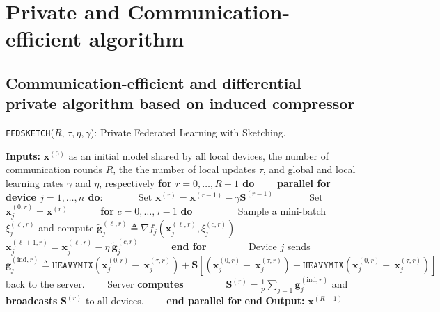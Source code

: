 \section{Private and Communication-efficient algorithm}


\subsection{Communication-efficient and differential private algorithm based on induced compressor}

\begin{algorithm}[H]
\caption{\texttt{FEDSKETCH}($R$, $\tau, \eta, \gamma$): Private Federated Learning with Sketching. }\label{Alg:combined}
\begin{algorithmic}[1]
\State \textbf{Inputs:} $\boldsymbol{x}^{(0)}$ as an initial  model shared by all local devices, the number of communication rounds $R$, the the number of local updates $\tau$, and global and local learning rates $\gamma$ and $\eta$, respectively
\State \textbf{for $r=0, \ldots, R-1$ do}
\State $\qquad$\textbf{parallel for device $j=1,\ldots,n$ do}:
\State $\qquad\quad$ Set $\boldsymbol{x}^{(r)}=\boldsymbol{x}^{(r-1)}-\gamma{\mathbf{S}}^{(r-1)}$
\State $\qquad\quad$ Set $\boldsymbol{x}_j^{(0,r)}=\boldsymbol{x}^{(r)}$ 
\State $\qquad\quad $\textbf{for} $c=0,\ldots,\tau-1$ \textbf{do}
\State $\qquad\quad\quad$ Sample a mini-batch $\xi_j^{(\ell,r)}$ and compute $\tilde{\mathbf{g}}_{j}^{(\ell,r)}\triangleq\nabla{f}_j(\boldsymbol{x}^{(\ell,r)}_j,\xi_j^{(c,r)})$
\State $\qquad\quad\quad$ $\boldsymbol{x}^{(\ell+1,r)}_{j}=\boldsymbol{x}^{(\ell,r)}_j-\eta~ \tilde{\mathbf{g}}_{j}^{(c,r)}$ \label{eq:update-rule-alg}
\State $\qquad\quad$\textbf{end for}
\State $\qquad\quad\quad$Device $j$ sends $$\mathbf{g}^{(\text{ind},r)}_j\triangleq \texttt{HEAVYMIX}\left(\boldsymbol{x}_j^{(0,r)}-~{\boldsymbol{x}}_{j}^{(\tau,r)}\right)+\mathbf{S}\left[\left(\boldsymbol{x}_j^{(0,r)}-~{\boldsymbol{x}}_{j}^{(\tau,r)}\right)-\texttt{HEAVYMIX}\left(\boldsymbol{x}_j^{(0,r)}-~{\boldsymbol{x}}_{j}^{(\tau,r)}\right)\right]$$ 
back to the server.
\State $\qquad$Server \textbf{computes} 
\State $\qquad\qquad {\mathbf{S}}^{(r)}=\frac{1}{p}\sum_{j=1}\mathbf{g}^{(\text{ind},r)}_j$ and \textbf{broadcasts} ${\mathbf{S}}^{(r)}$ to all devices.
\State $\qquad$\textbf{end parallel for}
\State \textbf{end}
\State \textbf{Output:} ${\boldsymbol{x}}^{(R-1)}$
\vspace{- 0.1cm}
\end{algorithmic}
\end{algorithm}
